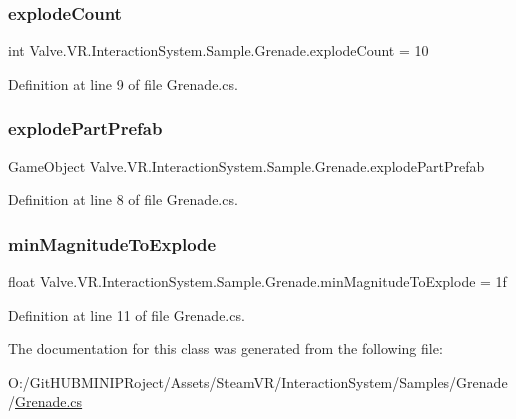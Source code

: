 \subsubsection{\texorpdfstring{explodeCount}{explodeCount}}
{\footnotesize\ttfamily int Valve.\+V\+R.\+Interaction\+System.\+Sample.\+Grenade.\+explode\+Count = 10}



Definition at line 9 of file Grenade.\+cs.

\mbox{\label{class_valve_1_1_v_r_1_1_interaction_system_1_1_sample_1_1_grenade_a35871cdd033148c6279bd16992cc656b}} 
\subsubsection{\texorpdfstring{explodePartPrefab}{explodePartPrefab}}
{\footnotesize\ttfamily Game\+Object Valve.\+V\+R.\+Interaction\+System.\+Sample.\+Grenade.\+explode\+Part\+Prefab}



Definition at line 8 of file Grenade.\+cs.

\mbox{\label{class_valve_1_1_v_r_1_1_interaction_system_1_1_sample_1_1_grenade_ac7b2055641a0a93c3416d80dd9eeeb62}} 
\subsubsection{\texorpdfstring{minMagnitudeToExplode}{minMagnitudeToExplode}}
{\footnotesize\ttfamily float Valve.\+V\+R.\+Interaction\+System.\+Sample.\+Grenade.\+min\+Magnitude\+To\+Explode = 1f}



Definition at line 11 of file Grenade.\+cs.



The documentation for this class was generated from the following file\+:\begin{DoxyCompactItemize}
\item 
O\+:/\+Git\+H\+U\+B\+M\+I\+N\+I\+P\+Roject/\+Assets/\+Steam\+V\+R/\+Interaction\+System/\+Samples/\+Grenade/\mbox{\hyperlink{_grenade_8cs}{Grenade.\+cs}}\end{DoxyCompactItemize}
